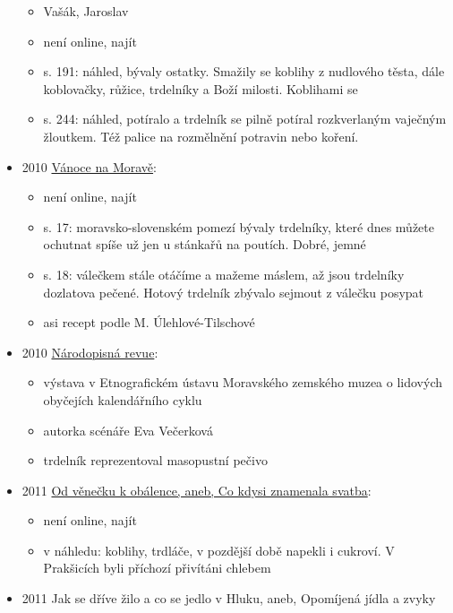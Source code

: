 \begin{itemize}
  \begin{itemize}
  \tightlist
  \item
    Vašák, Jaroslav
  \item
    není online, najít
  \item
    s. 191: náhled, bývaly ostatky. Smažily se koblihy z nudlového
    těsta, dále koblovačky, růžice, trdelníky a Boží milosti. Koblihami
    se
  \item
    s. 244: náhled, potíralo a trdelník se pilně potíral rozkverlaným
    vaječným žloutkem. Též palice na rozmělnění potravin nebo koření.
  \end{itemize}
\item
  2010
  \href{https://ceskadigitalniknihovna.cz/uuid/uuid:ed1ed830-6889-11e8-8470-005056827e52}{Vánoce
  na Moravě}:

  \begin{itemize}
  \tightlist
  \item
    není online, najít
  \item
    s. 17: moravsko-slovenském pomezí bývaly trdelníky, které dnes
    můžete ochutnat spíše už jen u stánkařů na poutích. Dobré, jemné
  \item
    s. 18: válečkem stále otáčíme a mažeme máslem, až jsou trdelníky
    dozlatova pečené. Hotový trdelník zbývalo sejmout z válečku posypat
  \item
    asi recept podle M. Úlehlové-Tilschové
  \end{itemize}
\item
  2010
  \href{https://www.digitalniknihovna.cz/mzk/uuid/uuid:924ec240-3c30-11e5-8851-005056827e51}{Národopisná
  revue}:

  \begin{itemize}
  \tightlist
  \item
    výstava v Etnografickém ústavu Moravského zemského muzea o lidových
    obyčejích kalendářního cyklu
  \item
    autorka scénáře Eva Večerková
  \item
    trdelník reprezentoval masopustní pečivo
  \end{itemize}
\item
  2011
  \href{https://ceskadigitalniknihovna.cz/uuid/uuid:05e8afb0-ef6c-11e5-bdc9-005056827e52}{Od
  věnečku k obálence, aneb, Co kdysi znamenala svatba}:

  \begin{itemize}
  \tightlist
  \item
    není online, najít
  \item
    v náhledu: koblihy, trdláče, v pozdější době napekli i cukroví. V
    Prakšicích byli příchozí přivítáni chlebem
  \end{itemize}
\item
  2011 Jak se dříve žilo a co se jedlo v Hluku, aneb, Opomíjená jídla a
  zvyky


\end{itemize}
